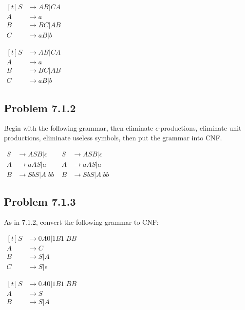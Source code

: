 \documentclass[12pt]{scrbook}
\begin{document}
$ \begin{aligned}[t]
  S &\rightarrow AB | CA \\
  A &\rightarrow a \\
  B &\rightarrow BC | AB \\
  C &\rightarrow aB | b
  \end{aligned} $

$ \begin{aligned}[t]
  S &\rightarrow AB | CA \\
  A &\rightarrow a \\
  B &\rightarrow BC | AB \\
  C &\rightarrow aB | b
  \end{aligned} $

\newpage \subsection*{Problem 7.1.2}Begin with the following grammar, then
eliminate $\epsilon$-productions, eliminate unit productions, eliminate
useless symbols, then put the grammar into CNF.

$ \begin{aligned}
  S &\rightarrow ASB | \epsilon \\
  A &\rightarrow aAS | a \\
  B &\rightarrow SbS | A | bb
  \end{aligned} 
$
$ \begin{aligned}
  S &\rightarrow ASB | \epsilon \\
  A &\rightarrow aAS | a \\
  B &\rightarrow SbS | A | bb
  \end{aligned} 
$

\subsection*{Problem 7.1.3}As in 7.1.2, convert the following grammar to CNF:

$ \begin{aligned}[t]
  S &\rightarrow 0A0| 1B1| BB \\
  A &\rightarrow C \\
  B &\rightarrow S | A \\
  C &\rightarrow S | \epsilon
\end{aligned}$

$ \begin{aligned}[t]
  S &\rightarrow 0A0| 1B1| BB \\
  A &\rightarrow S \\
  B &\rightarrow S | A \\
\end{aligned}$
\end{document}
